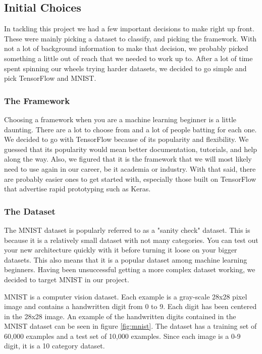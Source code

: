 \documentclass{article}
\begin{document}
\subsection{Initial Choices}

In tackling this project we had a few important decisions to make right up front. These were mainly picking a dataset to classify, and picking the framework. With not a lot of background information to make that decision, we probably picked something a little out of reach that we needed to work up to. After a lot of time spent spinning our wheels trying harder datasets, we decided to go simple and pick TensorFlow and MNIST. 

\subsubsection{The Framework}

Choosing a framework when you are a machine learning beginner is a little daunting. There are a lot to choose from and a lot of people batting for each one. We decided to go with TensorFlow because of its popularity and flexibility. We guessed that its popularity would mean better documentation, tutorials, and help along the way. Also, we figured that it is the framework that we will most likely need to use again in our career, be it academia or industry. With that said, there are probably easier ones to get started with, especially those built on TensorFlow that advertise rapid prototyping such as Keras. 

\subsubsection{The Dataset}

The MNIST dataset is popularly referred to as a "sanity check" dataset. This is because it is a relatively small dataset with not many categories. You can test out your new architecture quickly with it before turning it loose on your bigger datasets. This also means that it is a popular dataset among machine learning beginners. Having been unsuccessful getting a more complex dataset working, we decided to target MNIST in our project.

MNIST is a computer vision dataset. Each example is a gray-scale 28x28 pixel image and contains a handwritten digit from 0 to 9. Each digit has been centered in the 28x28 image. An example of the handwritten digits contained in the MNIST dataset can be seen in figure \ref{fig:mnist}. The dataset has a training set of 60,000 examples and a test set of 10,000 examples. Since each image is a 0-9 digit, it is a 10 category dataset.
\end{document}
